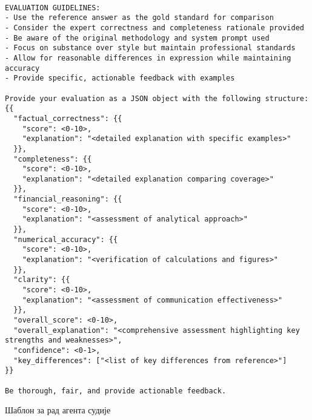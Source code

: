    \begin{center}
    \begin{listing}[!ht]
    \footnotesize
    \begin{verbatim}

EVALUATION GUIDELINES:
- Use the reference answer as the gold standard for comparison
- Consider the expert correctness and completeness rationale provided
- Be aware of the original methodology and system prompt used
- Focus on substance over style but maintain professional standards
- Allow for reasonable differences in expression while maintaining accuracy
- Provide specific, actionable feedback with examples

Provide your evaluation as a JSON object with the following structure:
{{
  "factual_correctness": {{
    "score": <0-10>,
    "explanation": "<detailed explanation with specific examples>"
  }},
  "completeness": {{
    "score": <0-10>,
    "explanation": "<detailed explanation comparing coverage>"
  }},
  "financial_reasoning": {{
    "score": <0-10>,
    "explanation": "<assessment of analytical approach>"
  }},
  "numerical_accuracy": {{
    "score": <0-10>,
    "explanation": "<verification of calculations and figures>"
  }},
  "clarity": {{
    "score": <0-10>,
    "explanation": "<assessment of communication effectiveness>"
  }},
  "overall_score": <0-10>,
  "overall_explanation": "<comprehensive assessment highlighting key strengths and weaknesses>",
  "confidence": <0-1>,
  "key_differences": ["<list of key differences from reference>"]
}}

Be thorough, fair, and provide actionable feedback.
    \end{verbatim}
    \caption{Шаблон за рад агента судије}\label{lst:judge_template}
    \end{listing}
    \end{center}